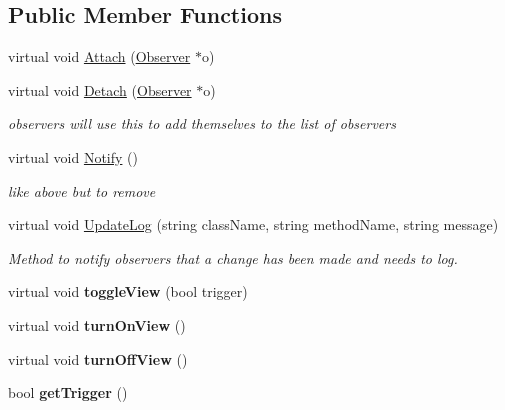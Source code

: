 \subsection*{Public Member Functions}
\begin{DoxyCompactItemize}
\item 
virtual void \hyperlink{class_subject_a4178d3cef008c713370791c6578334de}{Attach} (\hyperlink{class_observer}{Observer} $\ast$o)
\item 
virtual void \hyperlink{class_subject_ac839596fe840efb970e36a66554e3095}{Detach} (\hyperlink{class_observer}{Observer} $\ast$o)
\begin{DoxyCompactList}\small\item\em observers will use this to add themselves to the list of observers \end{DoxyCompactList}\item 
virtual void \hyperlink{class_subject_afdf01736ff099d286543b450d96215f1}{Notify} ()
\begin{DoxyCompactList}\small\item\em like above but to remove \end{DoxyCompactList}\item 
\hypertarget{class_subject_aee2f236ec1cda73bbbac9feb03c75d65}{}\label{class_subject_aee2f236ec1cda73bbbac9feb03c75d65} 
virtual void \hyperlink{class_subject_aee2f236ec1cda73bbbac9feb03c75d65}{Update\+Log} (string class\+Name, string method\+Name, string message)
\begin{DoxyCompactList}\small\item\em Method to notify observers that a change has been made and needs to log. \end{DoxyCompactList}\item 
\hypertarget{class_subject_a42271a96da468122222faaa0fac315ff}{}\label{class_subject_a42271a96da468122222faaa0fac315ff} 
virtual void {\bfseries toggle\+View} (bool trigger)
\item 
\hypertarget{class_subject_a46ef9cc92055d8218161b72354ff8ada}{}\label{class_subject_a46ef9cc92055d8218161b72354ff8ada} 
virtual void {\bfseries turn\+On\+View} ()
\item 
\hypertarget{class_subject_a2438c9d152211296c39ca51f650d026c}{}\label{class_subject_a2438c9d152211296c39ca51f650d026c} 
virtual void {\bfseries turn\+Off\+View} ()
\item 
\hypertarget{class_subject_a89aaadecf105e76a3b8ed589bd664978}{}\label{class_subject_a89aaadecf105e76a3b8ed589bd664978} 
bool {\bfseries get\+Trigger} ()

\end{DoxyCompactItemize}
